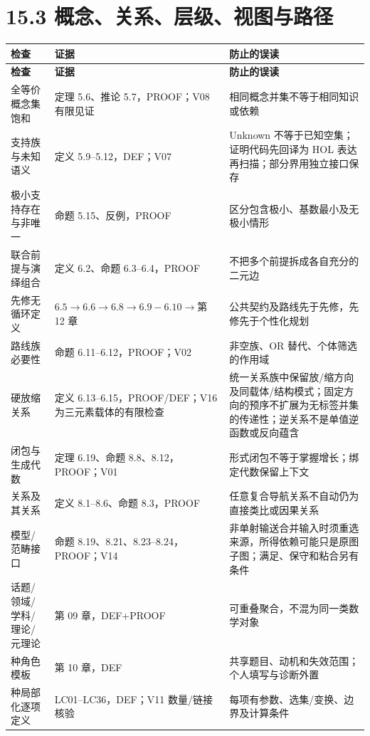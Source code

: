 \documentclass[UTF8,a4paper,zihao=-4,fontset=windows,openany]{ctexbook}
\begin{document}
\section{15.3 概念、关系、层级、视图与路径}
\begingroup\small\setlength{\tabcolsep}{4pt}
\begin{longtable}{>{\raggedright\arraybackslash}p{}>{\raggedright\arraybackslash}p{}>{\raggedright\arraybackslash}p{}}
\toprule
\textbf{检查} & \textbf{证据} & \textbf{防止的误读} \\
\midrule
\endfirsthead
\toprule
\textbf{检查} & \textbf{证据} & \textbf{防止的误读} \\
\midrule
\endhead
\bottomrule
\endfoot
\bottomrule
\endlastfoot
全等价概念集饱和 & 定理 5.6、推论 5.7，PROOF；V08 有限见证 & 相同概念并集不等于相同知识或依赖 \\
支持族与未知语义 & 定义 5.9–5.12，DEF；V07 & Unknown 不等于已知空集；证明代码先回译为 HOL 表达再扫描；部分界用独立接口保存 \\
极小支持存在与非唯一 & 命题 5.15、反例，PROOF & 区分包含极小、基数最小及无极小情形 \\
联合前提与演绎组合 & 定义 6.2、命题 6.3–6.4，PROOF & 不把多个前提拆成各自充分的二元边 \\
先修无循环定义 & \(6.5\to 6.6\to 6.8\to 6.9-6.10\to\)第 12 章 & 公共契约及路线先于先修，先修先于个性化规划 \\
路线族必要性 & 命题 6.11–6.12，PROOF；V02 & 非空族、OR 替代、个体筛选的作用域 \\
硬放缩关系 & 定义 6.13–6.15，PROOF/DEF；V16 为三元素载体的有限检查 & 统一关系族中保留放/缩方向及同载体/结构模式；固定方向的预序不扩展为无标签并集的传递性；逆关系不是单值逆函数或反向蕴含 \\
闭包与生成代数 & 定理 6.19、命题 8.8、8.12，PROOF；V01 & 形式闭包不等于掌握增长；绑定代数保留上下文 \\
关系及其关系 & 定义 8.1–8.6、命题 8.3，PROOF & 任意复合导航关系不自动仍为直接类比或因果关系 \\
模型/范畴接口 & 命题 8.19、8.21、8.23–8.24，PROOF；V14 & 非单射输送合并输入时须重选来源，所得依赖可能只是原图子图；满足、保守和粘合另有条件 \\
话题/领域/学科/理论/元理论 & 第 09 章，DEF+PROOF & 可重叠聚合，不混为同一类数学对象 \\
13 种角色模板 & 第 10 章，DEF & 共享题目、动机和失效范围；个人填写与诊断外置 \\
36 种局部化逐项定义 & LC01–LC36，DEF；V11 数量/链接核验 & 每项有参数、选集/变换、边界及计算条件 \\

\end{longtable}
\end{document}
